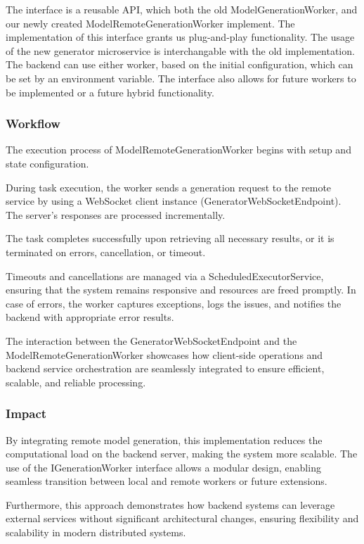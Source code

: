 				The interface is a reusable API, which both the old ModelGenerationWorker, and our newly created ModelRemoteGenerationWorker implement.
				The implementation of this interface grants us plug-and-play functionality. The usage of the new generator microservice is interchangable
				with the old implementation. The backend can use either worker, based on the initial configuration, which can be set by an environment
				variable.
				The interface also allows for future workers to be implemented or a future hybrid functionality.

			\subsubsection{Workflow}
				The execution process of ModelRemoteGenerationWorker begins with setup and state configuration. 

				During task execution, the worker sends a generation request to the remote service by using a WebSocket client instance (GeneratorWebSocketEndpoint). 
				The server's responses are processed incrementally.

				The task completes successfully upon retrieving all necessary results, or it is terminated on errors, cancellation, or timeout.

				Timeouts and cancellations are managed via a ScheduledExecutorService, ensuring that the system remains responsive and resources are freed promptly. In case of errors, the worker captures exceptions, logs the issues, and notifies the backend with appropriate error results.

				The interaction between the GeneratorWebSocketEndpoint and the ModelRemoteGenerationWorker 
				showcases how client-side operations and backend service orchestration are seamlessly integrated to ensure efficient, scalable, and reliable processing.

			\subsubsection{Impact}
				By integrating remote model generation, this implementation reduces the computational load on the backend server, 
				making the system more scalable. The use of the IGenerationWorker interface allows a modular design, enabling seamless 
				transition between local and remote workers or future extensions. 
				
				Furthermore, this approach demonstrates how backend systems can leverage external services without significant architectural changes, 
				ensuring flexibility and scalability in modern distributed systems.


